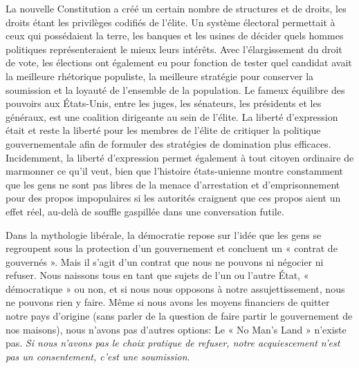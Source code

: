 La nouvelle Constitution a créé un certain nombre de structures et de droits, les droits étant les privilèges codifiés de l'élite. Un système électoral permettait à ceux qui possédaient la terre, les banques et les usines de décider quels hommes politiques représenteraient le mieux leurs intérêts. Avec l'élargissement du droit de vote, les élections ont également eu pour fonction de tester quel candidat avait la meilleure rhétorique populiste, la meilleure stratégie pour conserver la soumission et la loyauté de l'ensemble de la population. Le fameux équilibre des pouvoirs aux États-Unis, entre les juges, les sénateurs, les présidents et les généraux, est une coalition dirigeante au sein de l'élite. La liberté d'expression était et reste la liberté pour les membres de l'élite de critiquer la politique gouvernementale afin de formuler des stratégies de domination plus efficaces. Incidemment, la liberté d'expression permet également à tout citoyen ordinaire de marmonner ce qu'il veut, bien que l'histoire états-unienne montre constamment que les gens ne sont pas libres de la menace d'arrestation et d'emprisonnement pour des propos impopulaires si les autorités craignent que ces propos aient un effet réel, au-delà de souffle gaspillée dans une conversation futile.

Dans la mythologie libérale, la démocratie repose sur l'idée que les gens se regroupent sous la protection d'un gouvernement et concluent un « contrat de gouvernés ». Mais il s'agit d'un contrat que nous ne pouvons ni négocier ni refuser. Nous naissons tous en tant que sujets de l'un ou l'autre État, « démocratique » ou non, et si nous nous opposons à notre assujettissement, nous ne pouvons rien y faire. Même si nous avons les moyens financiers de quitter notre pays d'origine (sans parler de la question de faire partir le gouvernement de nos maisons), nous n'avons pas d'autres options: Le « No Man's Land » n'existe pas. \emph{Si nous n'avons pas le choix pratique de refuser, notre acquiescement n'est pas un consentement, c'est une soumission}.

